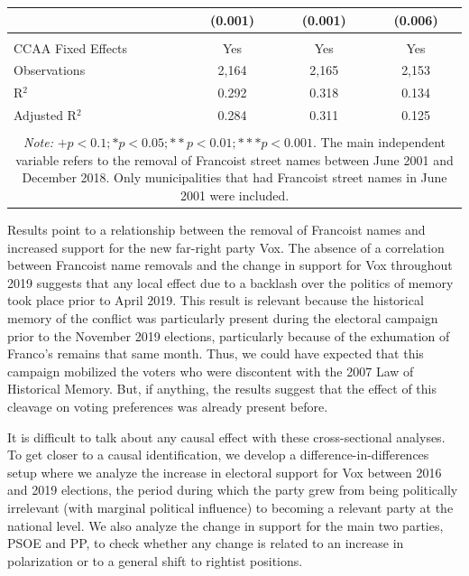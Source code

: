 \documentclass[12pt, notitlepage]{article}
\begin{document}
\begin{table}[!htbp]
\begin{tabular}{lccc}
  & (0.001) & (0.001) & (0.006) \\
 \hline \\[-1.8ex]
CCAA Fixed Effects & \multicolumn{1}{c}{Yes} & \multicolumn{1}{c}{Yes} & \multicolumn{1}{c}{Yes} \\
Observations & \multicolumn{1}{c}{2,164} & \multicolumn{1}{c}{2,165} & \multicolumn{1}{c}{2,153} \\
R$^{2}$ & \multicolumn{1}{c}{0.292} & \multicolumn{1}{c}{0.318} & \multicolumn{1}{c}{0.134} \\
Adjusted R$^{2}$ & \multicolumn{1}{c}{0.284} & \multicolumn{1}{c}{0.311} & \multicolumn{1}{c}{0.125} \\
\hline
\hline \\[-1.8ex]
\multicolumn{4}{c}{\parbox[t]{0.7\textwidth}{\textit{Note:} $+ p<0.1; * p<0.05; ** p<0.01; *** p<0.001$. The main independent variable refers to the removal of Francoist street names between June 2001 and December 2018. Only municipalities that had Francoist street names in June 2001 were included.}} \\
\end{tabular}
\end{table}

Results point to a relationship between the removal of Francoist names and increased support for the new far-right party Vox.
The absence of a correlation between Francoist name removals and the change in support for Vox throughout 2019 suggests that any local effect due to a backlash over the politics of memory took place prior to April 2019.
This result is relevant because the historical memory of the conflict was particularly present during the electoral campaign prior to the November 2019 elections, particularly because of the exhumation of Franco's remains that same month.
Thus, we could have expected that this campaign mobilized the voters who were discontent with the 2007 Law of Historical Memory.
But, if anything, the results suggest that the effect of this cleavage on voting preferences was already present before.

It is difficult to talk about any causal effect with these cross-sectional analyses.
To get closer to a causal identification, we develop a difference-in-differences setup where we analyze the increase in electoral support for Vox between 2016 and 2019 elections, the period during which the party grew from being politically irrelevant (with marginal political influence) to becoming a relevant party at the national level.
We also analyze the change in support for the main two parties, PSOE and PP, to check whether any change is related to an increase in polarization or to a general shift to rightist positions.
\end{document}
